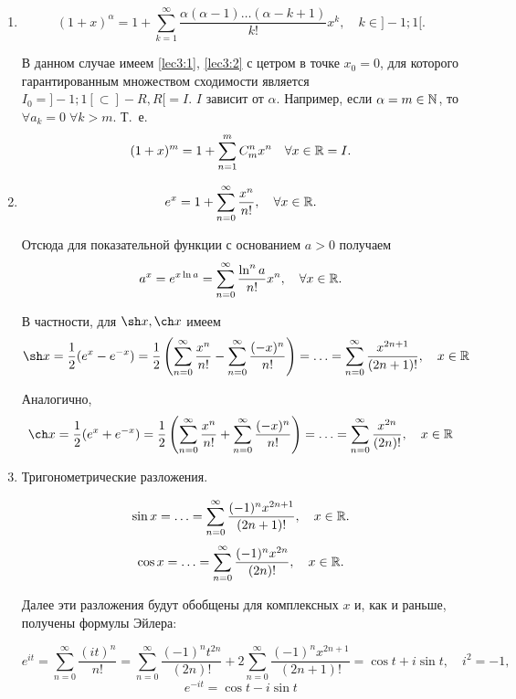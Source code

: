 \documentclass[../../main.tex]{subfiles}
\begin{document}
    \begin{enumerate}
        \item 
        \[(1 + x)^\alpha = 1 + \sum\limits_{k = 1}^{\infty} 
        \dfrac{\alpha(\alpha - 1)\ldots(\alpha - k + 1)}{k!}x^k, \quad k \in 
        ]-1; 1[.\]
        
        В данном случае имеем \eqref{lec3:1}, \eqref{lec3:2} с цетром в точке 
        $x_0 = 0$, для которого гарантированным множеством сходимости является 
        $I_0 = ]-1; 1[ \subset ]-R, R[ = I.$ $I$ зависит от $\alpha$. 
        Например, 
        если $\alpha = m \in \mathbb{N}$, то $\forall a_k = 0 \; \forall k > m$. Т.~е.
        \[(1 + x)^m = 1 + \sum\limits_{n = 1}^{m} C_m^n x^n \quad \forall x 
        \in \mathbb{R} = I.\]
        
        \item 
        \[e^x = 1 + \sum\limits_{n = 0}^{\infty} \frac{x^n}{n!},  \quad 
        \forall x \in \mathbb{R}.\]

        Отсюда для показательной функции с основанием $a > 0$ получаем
        \[ a^x = e^{x \ln a} = \sum\limits_{n = 0}^{\infty} 
        \frac{\ln^n a}{n!} x ^ n,  \quad \forall x \in \mathbb{R}.\]

        В частности, для $\sh x, \ch x$ имеем 
        \[\sh x = \frac12 (e^x - e^{-x}) = \frac12 
        \left(\sum\limits_{n = 0}^{\infty} \frac{x^n}{n!} - 
        \sum\limits_{n = 0}^{\infty} \frac{(-x)^n}{n!}\right) = \ldots =
        \sum\limits_{n = 0}^{\infty} \frac{x^{2n+1}}{(2n+1)!}, \quad x \in \R\]
    
        Аналогично,
        \[\ch x = \frac12 (e^x + e^{-x}) = \frac12 
        \left(\sum\limits_{n = 0}^{\infty} \frac{x^n}{n!} + 
        \sum\limits_{n = 0}^{\infty}\frac{(-x)^n}{n!}\right) = \ldots = 
        \sum\limits_{n = 0}^{\infty} \frac{x^{2n}}{(2n)!}, \quad x \in \R\]
    
        \item Тригонометрические разложения.
    
        \[\sin x = \ldots = \sum\limits_{n = 0}^{\infty} 
        \frac{(-1)^nx^{2n+1}}{(2n+1)!}, \quad x \in \mathbb{R}.\]
        \[\cos x = \ldots = \sum\limits_{n = 0}^{\infty} 
        \frac{(-1)^nx^{2n}}{(2n)!}, \quad x \in \mathbb{R}.\]
    
        Далее эти разложения будут обобщены для комплексных $x$ и, как 
        и раньше, получены формулы Эйлера:
    
        \[ e^{it} = \sum\limits_{n = 0}^{\infty} \frac{(it)^n}{n!} = 
        \sum\limits_{n = 0}^{\infty} \frac{(-1)^nt^{2n}}{(2n)!} + 
        2 \sum\limits_{n = 0}^{\infty} \frac{(-1)^nx^{2n+1}}{(2n+1)!} 
        = \cos t + i \sin t, \quad i^2 = -1,\]
        \[e^{-it} = \cos t - i \sin t\]


\end{enumerate}
\end{document}
